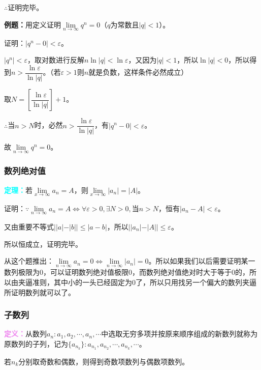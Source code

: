 \documentclass[UTF8, 12pt]{ctexart}
\begin{document}
$\therefore$证明完毕。

\textbf{例题：}用定义证明$\lim\limits_{n\to\infty}q^n=0$（$q$为常数且$\vert q\vert<1$）。

证明：$\vert q^n-0\vert<\varepsilon$。

$\vert q^n\vert<\varepsilon$，取对数进行反解$n\ln\vert q\vert<\ln\varepsilon$，又因为$\vert q\vert<1$，所以$\ln\vert q\vert<0$，所以得到$n>\dfrac{\ln\varepsilon}{\ln\vert q\vert}$。（若$\varepsilon>1$则$n$就是负数，这样条件必然成立）

取$N=\left[\dfrac{\ln\varepsilon}{\ln\vert q\vert}\right]+1$。

$\therefore$当$n>N$时，必然$n>\dfrac{\ln\varepsilon}{\ln\vert q\vert}$，有$\vert q^n-0\vert<\varepsilon$。

故$\lim\limits_{n\to\infty}q^n=0$。

\subsubsection{数列绝对值}

\textcolor{aqua}{\textbf{定理：}}若$\lim\limits_{x\to\infty}a_n=A$，则$\lim\limits_{x\to\infty}\vert a_n\vert=\vert A\vert$。

证明：$\because\lim\limits_{n\to\infty}a_n=A\Leftrightarrow\forall\varepsilon>0,\exists N>0,\text{当}n>N$，恒有$\vert a_n-A\vert<\varepsilon$。

又由重要不等式$\vert\vert a\vert-\vert b\vert\vert\leqslant\vert a-b\vert$，所以$\vert\vert a_n\vert-\vert A\vert\vert\leqslant\varepsilon$。

所以恒成立，证明完毕。

从这个题推出：$\lim\limits_{n\to\infty}a_n=0\Leftrightarrow\lim\limits_{n\to\infty}\vert a_n\vert=0$。所以如果我们以后需要证明某一数列极限为0，可以证明数列绝对值极限0，而数列绝对值绝对时大于等于0的，所以由夹逼准则，其中小的一头已经固定为0了，所以只用找另一个偏大的数列夹逼所证明数列就可以了。

\subsubsection{子数列}

\textcolor{violet}{\textbf{定义：}}从数列${a_n}:a_1,a_2,\cdots,a_n,\cdots$中选取无穷多项并按原来顺序组成的新数列就称为原数列的子列，记为$\{a_{n_k}\}:a_{n_1},a_{n_2},\cdots,a_{n_k},\cdots$。

若$n_k$分别取奇数和偶数，则得到奇数项数列与偶数项数列。
\end{document}
